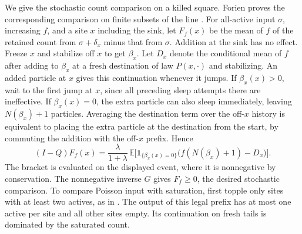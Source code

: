 \documentclass[11pt]{amsart}
\newcommand{\E}{\mathbb E}
\newcommand{\1}{\mathbf 1}
\begin{document}
We give the stochastic count comparison on a killed square. Forien proves the corresponding comparison on finite subsets of the line \cite[Lemma~7]{Forien}. For all-active input \(\sigma\), increasing \(f\), and a site \(x\) including the sink, let \(F_f(x)\) be the mean of \(f\) of the retained count from \(\sigma+\delta_x\) minus that from \(\sigma\). Addition at the sink has no effect. Freeze \(x\) and stabilize off \(x\) to get \(\beta_x\). Let \(D_x\) denote the conditional mean of \(f\) after adding to \(\beta_x\) at a fresh destination of law \(P(x,\cdot)\) and stabilizing. An added particle at \(x\) gives this continuation whenever it jumps. If \(\beta_x(x)>0\), wait to the first jump at \(x\), since all preceding sleep attempts there are ineffective. If \(\beta_x(x)=0\), the extra particle can also sleep immediately, leaving \(N(\beta_x)+1\) particles. Averaging the destination term over the off-\(x\) history is equivalent to placing the extra particle at the destination from the start, by commuting the addition with the off-\(x\) prefix. Hence
\[
 (I-Q)F_f(x)=\frac{\lambda}{1+\lambda}\,
     \E\big[\1_{\{\beta_x(x)=0\}}\big(f(N(\beta_x)+1)-D_x\big)\big].
\]
The bracket is evaluated on the displayed event, where it is nonnegative by conservation. The nonnegative inverse \(G\) gives \(F_f\ge0\), the desired stochastic comparison. To compare Poisson input with saturation, first topple only sites with at least two actives, as in \cite[\S6.2]{Forien}. The output of this legal prefix has at most one active per site and all other sites empty. Its continuation on fresh tails is dominated by the saturated count.
\end{document}
